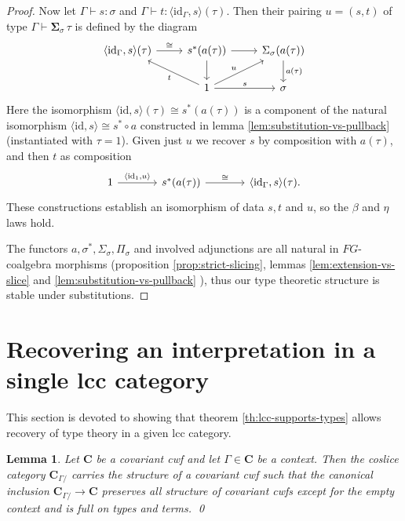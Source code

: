 \documentclass{article}
\newtheorem{lemma}{Lemma}
\theoremstyle{remark}
\theoremstyle{definition}
\begin{document}
\begin{proof}
  Now let $\Gamma \vdash s : \sigma$ and $\Gamma \vdash t : \langle \mathrm{id}_\Gamma, s \rangle(\tau)$.
  Then their pairing $u = (s, t)$ of type $\Gamma \vdash \mathbf{\Sigma}_\sigma \, \tau$ is defined by the diagram
  \begin{equation}
    \begin{tikzcd}
      \langle \mathrm{id}_\Gamma, s \rangle(\tau) \arrow[r, "\cong"] & s^*(a(\tau)) \arrow[r] \arrow[d] & \Sigma_\sigma(a(\tau)) \arrow[d, "a(\tau)"] \\
      & 1 \arrow[ul, "t"] \arrow[r, "s"] \arrow[ur, "u"] & \sigma
    \end{tikzcd}
  \end{equation}
  Here the isomorphism $\langle \mathrm{id}, s \rangle(\tau) \cong s^*(a(\tau))$ is a component of the natural isomorphism $\langle \mathrm{id}, s \rangle \cong s^* \circ a$ constructed in lemma \ref{lem:substitution-vs-pullback} (instantiated with $\tau = 1$).
  Given just $u$ we recover $s$ by composition with $a(\tau)$, and then $t$ as composition
  \begin{equation}
    \begin{tikzcd}[column sep=large]
      1 \arrow[r, "{\langle \mathrm{id}_1, u \rangle}"] & s^*(a(\tau)) \arrow[r, "\cong"] & \langle \mathrm{id}_\Gamma, s \rangle(\tau).
    \end{tikzcd}
  \end{equation}
  These constructions establish an isomorphism of data $s, t$ and $u$, so the $\beta$ and $\eta$ laws hold.

  The functors $a, \sigma^*, \Sigma_\sigma, \Pi_\sigma$ and involved adjunctions are all natural in $FG$-coalgebra morphisms (proposition \ref{prop:strict-slicing}, lemmas \ref{lem:extension-vs-slice} and \ref{lem:substitution-vs-pullback} ), thus our type theoretic structure is stable under substitutions.
\end{proof}

\section{Recovering an interpretation in a single lcc category}

This section is devoted to showing that theorem \ref{th:lcc-supports-types} allows recovery of type theory in a given lcc category.

\begin{lemma}
  Let $\mathbf{C}$ be a covariant cwf and let $\Gamma \in \mathbf{C}$ be a context.
  Then the coslice category $\mathbf{C}_{\Gamma /}$ carries the structure of a covariant cwf such that the canonical inclusion $\mathbf{C}_{\Gamma /} \rightarrow \mathbf{C}$ preserves all structure of covariant cwfs except for the empty context and is full on types and terms.
  \qed
\end{lemma}
\end{document}
